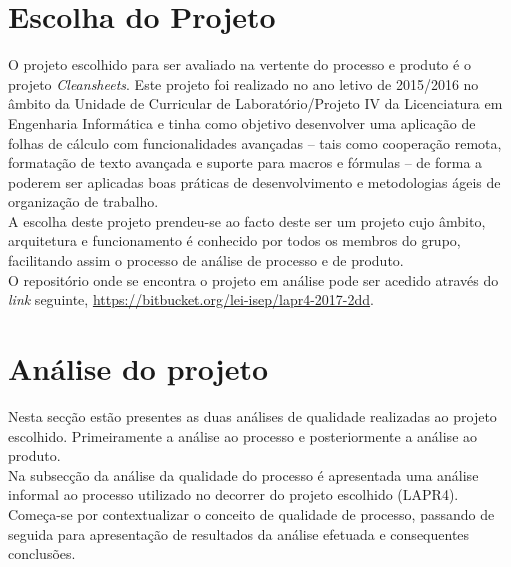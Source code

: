 \documentclass[openany,10pt,a4paper]{article}
\begin{document}
\section{Escolha do Projeto}
O projeto escolhido para ser avaliado na vertente do processo e produto é o projeto \textit{Cleansheets}. Este projeto foi realizado no ano letivo de 2015/2016 no âmbito da Unidade de Curricular de Laboratório/Projeto IV da Licenciatura em Engenharia Informática e tinha como objetivo desenvolver uma aplicação de folhas de cálculo com funcionalidades avançadas – tais como cooperação remota, formatação de texto avançada e suporte para macros e fórmulas – de forma a poderem ser aplicadas boas práticas de desenvolvimento e metodologias ágeis de organização de trabalho.\\
A escolha deste projeto prendeu-se ao facto deste ser um projeto cujo âmbito, arquitetura e funcionamento é conhecido por todos os membros do grupo, facilitando assim o processo de análise de processo e de produto. \\
O repositório onde se encontra o projeto em análise pode ser acedido através do \textit{link} seguinte, \url{https://bitbucket.org/lei-isep/lapr4-2017-2dd}.

\section{Análise do projeto}
Nesta secção estão presentes as duas análises de qualidade realizadas ao projeto escolhido. Primeiramente a análise ao processo e posteriormente a análise ao produto. \\
Na subsecção da análise da qualidade do processo é apresentada uma análise informal ao processo utilizado no decorrer do projeto escolhido (LAPR4). Começa-se por contextualizar o conceito de qualidade de processo, passando de seguida para apresentação de resultados da análise efetuada e consequentes conclusões. \\
\end{document}
